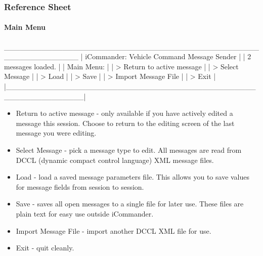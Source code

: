 \documentclass[11pt, letterpaper, oneside]{memoir}
\begin{document}
\subsubsection{Reference Sheet}
\paragraph{Main Menu}
\begin{boxedverbatim}
 ______________________________________________________________
|            iCommander: Vehicle Command Message Sender        |
|                        2 messages loaded.                    |
|    Main Menu:                                                |
|    > Return to active message                                |
|    > Select Message                                          |
|    > Load                                                    |
|    > Save                                                    |
|    > Import Message File                                     |
|    > Exit                                                    |
|______________________________________________________________|
\end{boxedverbatim}
\resetbvlinenumber
\begin{itemize}
\item Return to active message - only available if you have actively edited a message this session. Choose to return to the editing screen of the last message you were editing.
\item Select Message - pick a message type to edit. All messages are read from DCCL (dynamic compact control language) XML message files.
\item Load - load a saved message parameters file. This allows you to save values for message fields from session to session.
\item Save - saves all open messages to a single file for later use. These files are plain text for easy use outside iCommander.
\item Import Message File - import another DCCL XML file for use.
\item Exit - quit cleanly.
\end{itemize}
\end{document}
